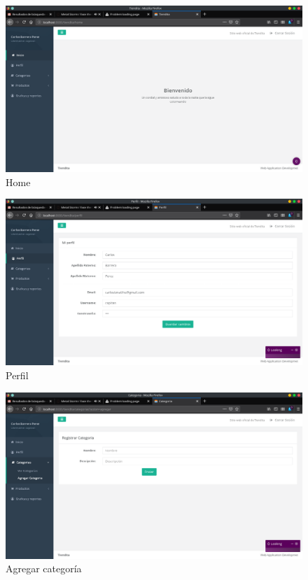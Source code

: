 \documentclass[a4paper,12pt]{article}
\begin{document}
\begin{figure}[H]
\begin{center}
 \includegraphics[width=\textwidth]{home.png}
 \caption{Home}
 \label{fig:home}
\end{center}
\end{figure}

\begin{figure}[H]
\begin{center}
 \includegraphics[width=\textwidth]{perfil.png}
 \caption{Perfil}
 \label{fig:perfil}
\end{center}
\end{figure}

\begin{figure}[H]
\begin{center}
 \includegraphics[width=\textwidth]{agregar_categoria.png}
 \caption{Agregar categoría}
 \label{fig:agregar_categoria}
\end{center}
\end{figure}
\end{document}
